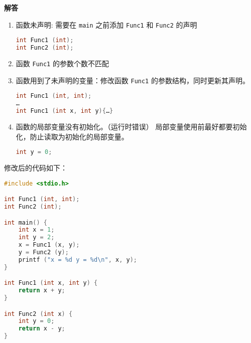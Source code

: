 \documentclass[10pt,a4paper,UTF8]{ctexart}
\newenvironment{solution}{\par\noindent\textbf{解答}\ }{\par}
\begin{document}
\begin{solution}
	\begin{enumerate}[1.]
		\item 函数未声明:
			需要在 \verb|main| 之前添加 \verb|Func1| 和 \verb|Func2| 的声明
			\begin{lstlisting}[language=C]
int Func1 (int);
int Func2 (int);				
			\end{lstlisting}

	   	\item 函数 \verb|Func1| 的参数个数不匹配
		\item 函数用到了未声明的变量：修改函数 \verb|Func1| 的参数结构，同时更新其声明。
		\begin{lstlisting}[language=C]
int Func1 (int, int);
…
int Func1 (int x, int y){…}			
		\end{lstlisting}
		\item 函数的局部变量没有初始化。（运行时错误）
		局部变量使用前最好都要初始化，防止读取为初始化的局部变量。
		\begin{lstlisting}[language=C]
int y = 0;
		\end{lstlisting}
	\end{enumerate}
	修改后的代码如下：
	\begin{lstlisting}[language=C]
#include <stdio.h> 

int Func1 (int, int);
int Func2 (int);

int main() { 
	int x = 1; 
	int y = 2; 
	x = Func1 (x, y); 
	y = Func2 (y); 
	printf ("x = %d y = %d\n", x, y); 
} 

int Func1 (int x, int y) { 
	return x + y; 
} 

int Func2 (int x) { 
	int y = 0; 
	return x - y; 
} 
	\end{lstlisting}
\end{solution}
\end{document}
